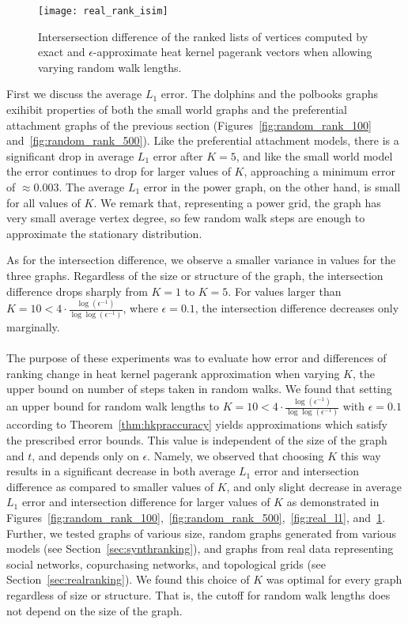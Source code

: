 \documentclass[runningheads,a4paper]{llncs}
\newcommand{\kparam}{\frac{\log(\epsilon^{-1})}{\log\log(\epsilon^{-1})}}
\begin{document}
\begin{figure}
\centering
\texttt{[image: real\_rank\_isim]}
\caption{Intersersection difference of the ranked lists of vertices computed by
exact and $\epsilon$-approximate heat kernel pagerank vectors when allowing
varying random walk lengths.}
\label{fig:real_rank_isim}
\end{figure}

First we discuss the average $L_1$ error.  The dolphins and the polbooks graphs
exihibit properties of both the small world graphs and the preferential
attachment graphs of the previous section (Figures~\ref{fig:random_rank_100}
and~\ref{fig:random_rank_500}).  Like the preferential attachment models, there
is a significant drop in average $L_1$ error after $K=5$, and like the small
world model the error continues to drop for larger values of $K$, approaching a
minimum error of $\approx 0.003$.  The average $L_1$ error in the power graph,
on the other hand,  is small for all values of $K$.  We remark that,
representing a power grid, the graph has very small average vertex degree, so
few random walk steps are enough to approximate the stationary distribution.

As for the intersection difference, we observe a smaller variance in values for
the three graphs.  Regardless of the size or structure of the graph, the
intersection difference drops sharply from $K=1$ to $K=5$.  For values larger
than $K = 10 < 4\cdot \kparam$, where $\epsilon = 0.1$, the intersection
difference decreases only marginally.


\paragraph{}The purpose of these experiments was to evaluate how error and differences of
ranking change in heat kernel pagerank approximation when varying $K$, the upper
bound on number of steps taken in random walks.  We found that setting an upper
bound for random walk lengths to $K = 10 < 4\cdot \kparam$ with $\epsilon = 0.1$
according to Theorem~\ref{thm:hkpraccuracy} yields approximations which satisfy
the prescribed error bounds.  This value is independent of the size of the graph
and $t$, and depends only on $\epsilon$.  Namely, we observed that choosing $K$
this way results in a significant decrease in both average $L_1$ error and
intersection difference as compared to smaller values of $K$, and only slight
decrease in average $L_1$ error and intersection difference for larger values of
$K$ as demonstrated in
Figures~\ref{fig:random_rank_100},~\ref{fig:random_rank_500},~\ref{fig:real_l1},
and~\ref{fig:real_rank_isim}.  Further, we tested graphs of various size, random
graphs generated from various models (see Section~\ref{sec:synthranking}), and
graphs from real data representing social networks, copurchasing networks, and
topological grids (see Section~\ref{sec:realranking}).  We found this choice of
$K$ was optimal for every graph regardless of size or structure.  That is, the
cutoff for random walk lengths does not depend on the size of the graph.
\end{document}
